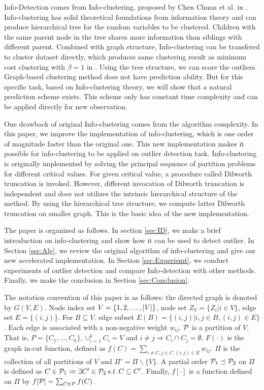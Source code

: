 \documentclass[runningheads]{llncs}
\begin{document}
Info-Detection comes from Info-clustering, proposed by Chen Chuan et al. in \cite{RN1}. Info-clustering has solid theoretical foundations from information theory and can produce hierarchical tree for the random variables to be clustered. Children with the same parent node in the tree shares more information than siblings with different parent. Combined with graph structure, Info-clustering can be transfered to cluster dataset directly, which produces same clustering result as minimum cost clustering with $\beta = 1$ in \cite{RN7}.  Using the tree structure, we can score the outliers. Graph-based clustering method does not have prediction ability. But for this specific task, based on Info-clustering theory, we will show that a natural prediction scheme exists. This scheme only has constant time complexity and can be applied directly for new observation.

One drawback of original Info-clustering comes from the algorithm complexity. In this paper, we improve the implementation of info-clustering, which is one order of magnitude faster than the original one. This new implementation makes it possible for info-clustering to be applied on outlier detection task.
Info-clustering is originally implemented by solving the principal sequence of partition problems for different critical values. For given critical value, a procedure called Dilworth truncation is invoked. However, different invocation of Dilworth truncation is independent and does not utilizes the intrinsic hierarchical structure of the method. By using the hierarchical tree structure, we compute latter Dilworth truncation on smaller graph. This is the basic idea of the new implementation. 

The paper is organized as follows. In section \ref{sec:ID}, we make a brief introduction on info-clustering and show how it can be used to detect outlier. In Section \ref{sec:Alg}, we review the original algorithm of info-clustering and give our new accelerated implementation. In Section \ref{sec:Experiemt}, we conduct experiments of outlier detection and compare Info-detection with other methods. Finally, we make the conclusion in Section \ref{sec:Conclusion}.

The notation convention of this paper is as follows: the directed graph is denoted by $G(V, E)$. Node index set $V=\{1, 2,\dots, \abs{V}\}$, node set $Z_V=\{Z_i | i \in V\}$, edge set $E=\{(i, j)\}$. For $B\subseteq V$. edge subset $E(B) = \{(i,j)| i, j \in B,(i,j)\in E\}$. Each edge is associated with a non-negative weight $w_{ij}$. $\P$ is a partition of $V$. That is, $P=\{C_1, \dots, C_k\}, \cup_{i=1}^k C_i=V$ and $i\neq j \Rightarrow C_i \cap C_j =\emptyset $. $F(\cdot)$ is the graph in-cut function, defined as $f(C)=\sum_{i \neq C, j\in C, (i,j) \in E} w_{ij}$. $\Pi$ is the collection of all partitions of $V$ and $\Pi'=\Pi\backslash\{V\}$. A partial order $ \P_1 \preceq \P_2$ on $\Pi$ is defined as
$C \in \P_1 \Rightarrow \exists C' \in \P_2 \, s.t. \, C \subseteq C'$.
Finally, $f[\cdot]$ is a function defined on $\Pi$ by $f[\P]=\sum_{C\in \P}f(C)$.
\end{document}
